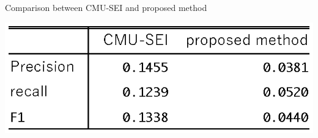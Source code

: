\documentclass[JIP]{apris}
\begin{document}
\begin{table}[t]
 \centering
 \caption{Comparison between CMU-SEI and proposed method}
 \includegraphics[width=1.0\hsize]{image/cmu-pro.eps} 
 \label{table2} 
\end{table}






\end{document}

